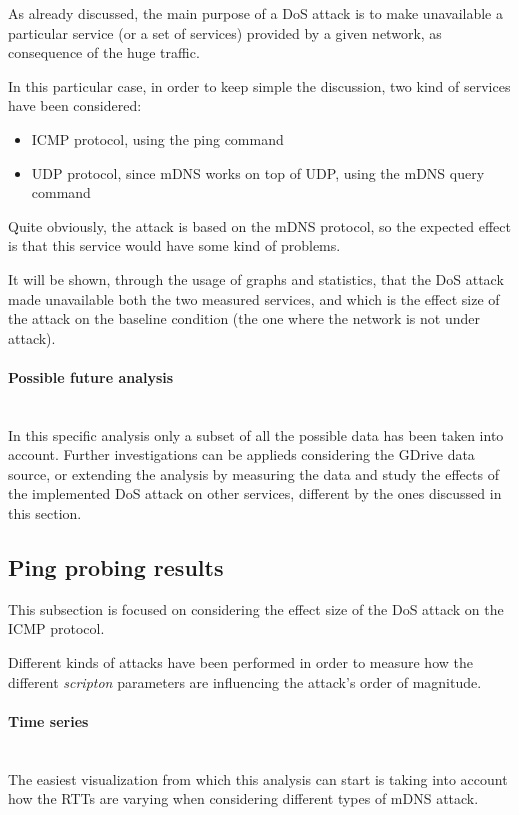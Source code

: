 \documentclass[fleqn, 11pt]{SelfArx} %
\begin{document}
As already discussed, the main purpose of a DoS attack is to make unavailable a particular service (or a set of services) provided by a given network, as consequence of the huge traffic.

In this particular case, in order to keep simple the discussion, two kind of services have been considered:
\begin{itemize}[leftmargin=*]
	\item ICMP protocol, using the ping command
 	\item UDP protocol, since mDNS works on top of UDP, using the mDNS query command
\end{itemize}

Quite obviously, the attack is based on the mDNS protocol, so the expected effect is that this service would have some kind of problems.

It will be shown, through the usage of graphs and statistics, that the DoS attack made unavailable both the two measured services, and which is the effect size of the attack on the baseline condition (the one where the network is not under attack).
\paragraph{Possible future analysis}\mbox{}\\
In this specific analysis only a subset of all the possible data has been taken into account.
Further investigations can be applieds considering the GDrive data source, or extending the analysis by measuring the data and study the effects of the implemented DoS attack on other services, different by the ones discussed in this section.

\subsection{Ping probing results}
This subsection is focused on considering the effect size of the DoS attack on the ICMP protocol.

Different kinds of attacks have been performed in order to measure how the different {\it{scripton}} parameters are influencing the attack's order of magnitude.

\paragraph{Time series}\mbox{}\\
The easiest visualization from which this analysis can start is taking into account how the RTTs are varying when considering different types of mDNS attack.
\end{document}
